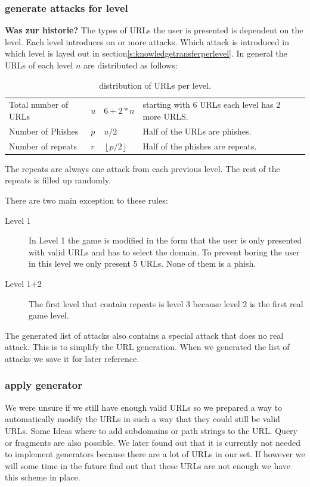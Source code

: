 \subsubsection{generate attacks for level}
\textbf{Was zur historie?}
The types of URLs the user is presented is dependent on the level.
Each level introduces on or more attacks.
Which attack is introduced in which level is layed out in section\ref{s:knowledgetransferperlevel}.
In general the URLs of each level $n$ are distributed as follows:
\begin{table}[hHtbp]
\centering
\begin{tabular}{llll}
Total number of URLs&$u$&$6+2*n$&starting with 6 URLs each level has 2 more URLS.\\
Number of Phishes&$p$&$u/2$&Half of the URLs are phishes.\\
Number of repeats&$r$&$\left\lfloor p/2 \right\rfloor$&Half of the phishes are repeats.
\end{tabular}
\caption{distribution of URLs per level.}
\label{t:levelurls}
\end{table}

The repeats are always one attack from each previous level. The rest of the repeats is filled up randomly.

There are two main exception to these rules:
\begin{description}
\item[Level 1] In Level 1 the game is modified in the form that the user is only presented with valid URLs and has to select the domain.
To prevent boring the user in this level we only present 5 URLs.
None of them is a phish.
\item[Level 1+2] The first level that contain repeats is level 3 because level 2 is the first real game level.
\end{description}

The generated list of attacks also contains a special attack that does no real attack. This is to simplify the URL generation. When we generated the list of attacks we save it for later reference.
\subsubsection{apply generator}
We were unsure if we still have enough valid URLs so we prepared a way to automatically modify the URLs in such a way that they could still be valid URLs. Some Ideas where to add subdomains or path strings to the URL. Query or fragments are also possible. We later found out that it is currently not needed to implement generators because there are a lot of URLs in our set. If however we will some time in the future find out that these URLs are not enough we have this scheme in place.
